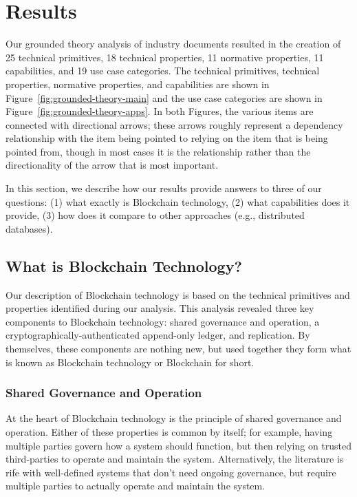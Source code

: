 
\section{Results}

Our grounded theory analysis of industry documents resulted in the creation of 25 technical primitives, 18 technical properties, 11 normative properties, 11 capabilities, and 19 use case categories.
The technical primitives, technical properties, normative properties, and capabilities are shown in Figure~\ref{fig:grounded-theory-main} and the use case categories are shown in Figure~\ref{fig:grounded-theory-apps}.
In both Figures, the various items are connected with directional arrows; these arrows roughly represent a dependency relationship with the item being pointed to relying on the item that is being pointed from, though in most cases it is the relationship rather than the directionality of the arrow that is most important.

In this section, we describe how our results provide answers to three of our questions:  (1) what exactly is Blockchain technology, (2) what capabilities does it provide, (3) how does it compare to other approaches (e.g., distributed databases).

\subsection{What is Blockchain Technology?}
Our description of Blockchain technology is based on the technical primitives and properties identified during our analysis.
This analysis revealed three key components to Blockchain technology: shared governance and operation, a cryptographically-authenticated append-only ledger, and replication.
By themselves, these components are nothing new, but used together they form what is known as Blockchain technology or Blockchain for short.

\subsubsection{Shared Governance and Operation}
At the heart of Blockchain technology is the principle of shared governance and operation.
Either of these properties is common by itself; for example, having multiple parties govern how a system should function, but then relying on trusted third-parties to operate and maintain the system.
Alternatively, the literature is rife with well-defined systems that don't need ongoing governance, but require multiple parties to actually operate and maintain the system.

